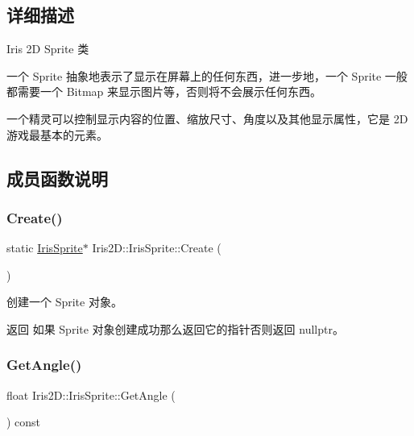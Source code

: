 \subsection{详细描述}
Iris 2D Sprite 类 

一个 Sprite 抽象地表示了显示在屏幕上的任何东西，进一步地，一个 Sprite 一般都需要一个 Bitmap 来显示图片等，否则将不会展示任何东西。

一个精灵可以控制显示内容的位置、缩放尺寸、角度以及其他显示属性，它是 2D 游戏最基本的元素。 

\subsection{成员函数说明}
\mbox{\label{class_iris2_d_1_1_iris_sprite_ab68ea873fcd8521324c8497455dee852}} 
\subsubsection{\texorpdfstring{Create()}{Create()}}
{\footnotesize\ttfamily static \hyperlink{class_iris2_d_1_1_iris_sprite}{Iris\+Sprite}$\ast$ Iris2\+D\+::\+Iris\+Sprite\+::\+Create (\begin{DoxyParamCaption}{ }\end{DoxyParamCaption})\hspace{0.3cm}{\ttfamily [static]}}



创建一个 Sprite 对象。 

\begin{DoxyReturn}{返回}
如果 Sprite 对象创建成功那么返回它的指针否则返回 nullptr。 
\end{DoxyReturn}
\mbox{\label{class_iris2_d_1_1_iris_sprite_aef46b946bf5f46465ea164debdc78e57}} 
\subsubsection{\texorpdfstring{Get\+Angle()}{GetAngle()}}
{\footnotesize\ttfamily float Iris2\+D\+::\+Iris\+Sprite\+::\+Get\+Angle (\begin{DoxyParamCaption}{ }\end{DoxyParamCaption}) const}



